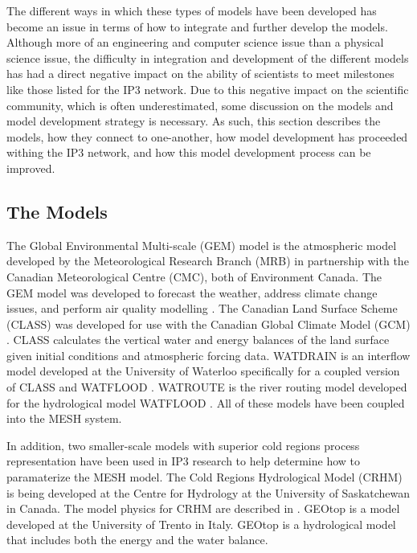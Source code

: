 \documentclass[hess]{copernicus}
\begin{document}
The different ways in which these types of models have been developed has become an issue in terms of how to integrate and further develop the models. Although more of an engineering and computer science issue than a physical science issue, the difficulty in integration and development of the different models has had a direct negative impact on the ability of scientists to meet milestones like those listed for the IP3 network. Due to this negative impact on the scientific community, which is often underestimated, some discussion on the models and model development strategy is necessary. As such, this section describes the models, how they connect to one-another, how model development has proceeded withing the IP3 network, and how this model development process can be improved.

\subsection{The Models}
The Global Environmental Multi-scale (GEM) model is the atmospheric model developed by the Meteorological Research Branch (MRB) in partnership with the Canadian Meteorological Centre (CMC), both of Environment Canada. The GEM model was developed to forecast the weather, address climate change issues, and perform air quality modelling \citep{cote_etal:1998}. The Canadian Land Surface Scheme (CLASS) was developed for use with the Canadian Global Climate Model (GCM) \citep{verseghy:1991,verseghy_etal:1993,verseghy:2009}. CLASS calculates the vertical water and energy balances of the land surface given initial conditions and atmospheric forcing data. WATDRAIN is an interflow model developed at the University of Waterloo specifically for a coupled version of CLASS and WATFLOOD \citep{soulis_etal:2000}. WATROUTE is the river routing model developed for the hydrological model WATFLOOD \citep{kouwen_mousavi:2002}. All of these models have been coupled into the MESH system.

In addition, two smaller-scale models with superior cold regions process representation have been used in IP3 research to help determine how to paramaterize the MESH model. The Cold Regions Hydrological Model (CRHM) is being developed at the Centre for Hydrology at the University of Saskatchewan in Canada. The model physics for CRHM are described in \cite{pomeroy_etal:2007}. GEOtop \citep{rigon_etal:2006,endrizzi:2007} is a model developed at the University of Trento in Italy. GEOtop is a hydrological model that includes both the energy and the water balance.
\end{document}
